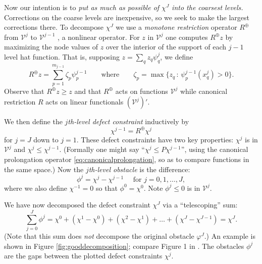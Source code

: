 \documentclass[letterpaper,final,12pt,reqno]{amsart}
\theoremstyle{claim}
\newcommand{\mR}{R^{\bm{\oplus}}}
\numberwithin{equation}{section}
\numberwithin{figure}{section}
\numberwithin{table}{section}
\numberwithin{theorem}{section}
\begin{document}
Now our intention is to \emph{put as much as possible of $\chi^J$ into the coarsest levels.}  Corrections on the coarse levels are inexpensive, so we seek to make the largest corrections there.  To decompose $\chi^J$ we use a \emph{monotone restriction} operator $\mR$ from $\mathcal{V}^j$ to $\mathcal{V}^{j-1}$ \cite[equation (4.22)]{GraeserKornhuber2009}, a nonlinear operator.  For $z$ in $\mathcal{V}^j$ one computes $\mR z$ by maximizing the node values of $z$ over the interior of the support of each $j-1$ level hat function.  That is, supposing $z = \sum_q z_q \psi_q^j$, we define
\begin{equation}
  \mR z = \sum_{p=1}^{m_{j-1}} \zeta_p \psi_p^{j-1} \qquad \text{where} \qquad \zeta_p = \max \{z_q \,:\, \psi_p^{j-1}(x_q^j) > 0\}.  \label{eq:monotonerestriction}
\end{equation}
Observe that $\mR z \ge z$ and that $\mR$ acts on functions $\mathcal{V}^j$ while canonical restriction $R$ acts on linear functionals $(\mathcal{V}^j)'$.

We then define the \emph{$j$th-level defect constraint} inductively by
\begin{equation}
  \chi^{j-1} = \mR \chi^j  \label{eq:chik}
\end{equation}
for $j=J$ down to $j=1$.  These defect constraints have two key properties: $\chi^j$ is in $\mathcal{V}^j$ and $\chi^j \le \chi^{j-1}$.  (Formally one might say ``$\chi^j \le P \chi^{j-1}$'', using the canonical prolongation operator \eqref{eq:canonicalprolongation}, so as to compare functions in the same space.)  Now the \emph{$j$th-level obstacle} is the difference:
\begin{equation}
  \phi^j = \chi^j - \chi^{j-1} \quad \text{ for } j=0,1,\dots,J,  \label{eq:levelobstacle}
\end{equation}
where we also define $\chi^{-1}=0$ so that $\phi^0 = \chi^0$.  Note $\phi^j\le 0$ is in $\mathcal{V}^j$.

We have now decomposed the defect constraint $\chi^J$ via a ``telescoping'' sum:
\begin{equation}
  \sum_{j=0}^J \phi^j = \chi^0 + (\chi^1 - \chi^0) + (\chi^2 - \chi^1) + \dots + (\chi^J - \chi^{J-1}) = \chi^J.  \label{eq:telescopingdecomposition}
\end{equation}
(Note that this sum does \emph{not} decompose the original obstacle $\varphi^J$.)  An example is shown in Figure \ref{fig:gooddecomposition}; compare Figure 1 in \cite{GraeserKornhuber2009}.  The obstacles $\phi^j$ are the gaps between the plotted defect constraints $\chi^j$.
\end{document}
